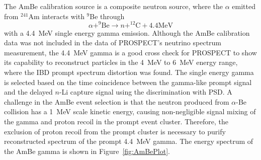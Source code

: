 The AmBe calibration source is a composite neutron source, where the $\alpha$ emitted from $^{241}$Am interacts with $^9$Be through
\begin{equation}
	\alpha + ^9\textrm{Be} \rightarrow n + ^{12}\textrm{C} + 4.4 \textrm{MeV}
\end{equation} 
with a 4.4~MeV single energy gamma emission.
Although the AmBe calibration data was not included in the data of PROSPECT's neutrino spectrum measurement, the 4.4~MeV gamma is a good cross check for PROSPECT to show its capability to reconstruct particles in the 4~MeV to 6~MeV energy range, where the IBD prompt spectrum distortion was found.
The single energy gamma is selected based on the time coincidence between the gamma-like prompt signal and the delayed $n$-Li capture signal using the discrimination with PSD.
A challenge in the AmBe event selection is that the neutron produced from $\alpha$-Be collision has a 1~MeV scale kinetic energy, causing non-negligible signal mixing of the gamma and proton recoil in the prompt event cluster.
Therefore, the exclusion of proton recoil from the prompt cluster is necessary to purify reconstructed spectrum of the prompt 4.4~MeV gamma.
The energy spectrum of the AmBe gamma is shown in Figure~\ref{fig:AmBePlot}.

